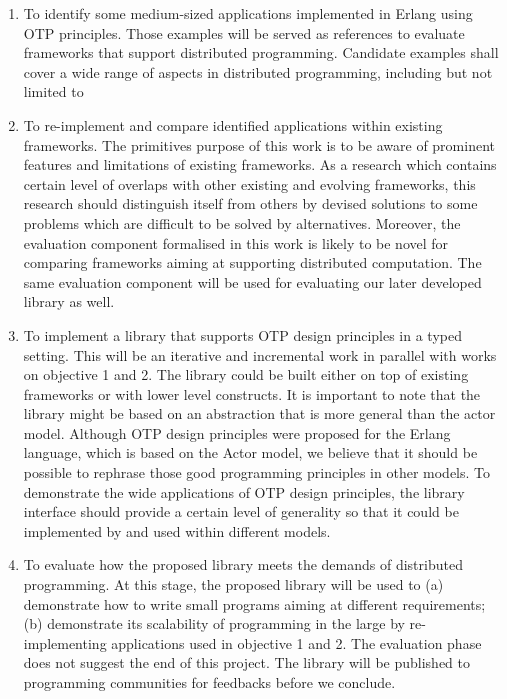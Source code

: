 \begin{enumerate}
  \item To identify some medium-sized applications implemented in Erlang using OTP principles.  Those examples will be served as references to evaluate frameworks that support distributed programming.  Candidate examples shall cover a wide range of aspects in distributed programming, including but not limited to 
  \item To re-implement and compare identified applications within existing frameworks.  The primitives purpose of this work is to be aware of prominent features and limitations of existing frameworks.  As a research which contains certain level of overlaps with other existing and evolving frameworks, this research should distinguish itself from others by devised solutions to some problems which are difficult to be solved by alternatives.  Moreover, the evaluation component formalised in this work is likely to be novel for comparing frameworks aiming at supporting distributed computation.  The same evaluation component will be used for evaluating our later developed library as well.
  \item To implement a library that supports OTP design principles in a typed setting.  This will be an iterative and incremental work in parallel with works on objective 1 and 2.  The library could be built either on top of existing frameworks or with lower level constructs.  It is important to note that the library might be based on an abstraction that is more general than the actor model.  Although OTP design principles were proposed for the Erlang language, which is based on the Actor model, we believe that it should be possible to rephrase those good programming principles in other models.  To demonstrate the wide applications of OTP design principles, the library interface should provide a certain level of generality so that it could be implemented by and used within different models.
  \item To evaluate how the proposed library meets the demands of distributed programming.  At this stage, the proposed library will be used to (a) demonstrate how to write small programs aiming at different requirements; (b) demonstrate its scalability of programming in the large by re-implementing applications used in objective 1 and 2.  The evaluation phase does not suggest the end of this project.  The library will be published to programming communities for feedbacks before we conclude.

\end{enumerate}